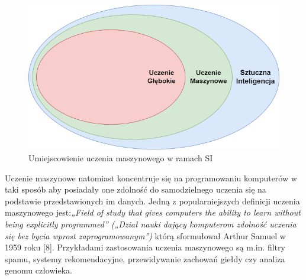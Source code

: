 \documentclass[a4paper,12pt,oneside]{book}
\begin{document}
\begin{figure}[h]
\centering
\includegraphics[scale=0.55]{UczenieMaszynowe.png}
\caption{Umiejscowienie uczenia maszynowego w ramach SI}
\end{figure}

Uczenie maszynowe natomiast koncentruje się na programowaniu komputerów w taki sposób aby posiadały one zdolność do samodzielnego uczenia się na podstawie przedstawionych im danych. Jedną z popularniejszych definicji uczenia maszynowego jest:\textit{„Field of study that gives computers the ability to learn without being explicitly programmed” („Dział nauki dający komputerom zdolność uczenia się bez bycia wprost zaprogramowanym”)} którą sformułował Arthur Samuel w 1959 roku [8]. Przykładami zastosowania uczenia maszynowego są m.in. filtry spamu, systemy rekomendacyjne, przewidywanie zachowań giełdy czy analiza genomu człowieka.  
\end{document}
